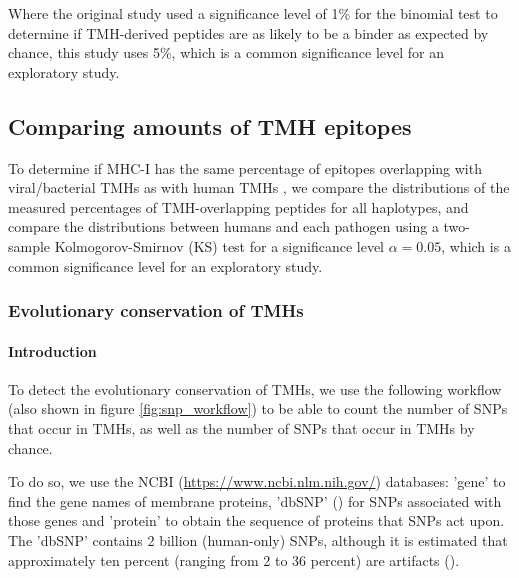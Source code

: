 Where the original study used a significance level of 1\% 
for the binomial test to determine if TMH-derived peptides 
are as likely to be a binder as expected by chance, this study
uses 5\%, which is a common significance level for an exploratory study.

\subsection{Comparing amounts of TMH epitopes}

To determine if MHC-I has the same percentage of epitopes overlapping
with viral/bacterial TMHs as with human TMHs , 
we compare the distributions of the measured percentages 
of TMH-overlapping peptides for all haplotypes,
and compare the distributions between humans and each pathogen
using a two-sample Kolmogorov-Smirnov (KS) test
for a significance level $\alpha = 0.05$, 
which is a common significance level for an exploratory study.

\subsubsection{Evolutionary conservation of TMHs}

\paragraph{Introduction}

To detect the evolutionary conservation of TMHs, 
we use the following workflow (also shown
in figure \ref{fig:snp_workflow}) to be able to count the
number of SNPs that occur in TMHs, as well as the number of SNPs
that occur in TMHs by chance.

To do so, we use the 
NCBI (\url{https://www.ncbi.nlm.nih.gov/}) databases:
'gene' to find the gene names of membrane proteins, 
'dbSNP' (\cite{sherry2001dbsnp}) for SNPs associated with those genes
and 'protein' to obtain the sequence of proteins that SNPs act upon.
The 'dbSNP' contains 2 billion (human-only) SNPs, although
it is estimated that approximately ten percent (ranging from 2 to 36 percent) 
are artifacts (\cite{carlson2003additional, cutler2001high, gabriel2002structure, mitchell2004discrepancies, musumeci2010single, reich2003quality}).

